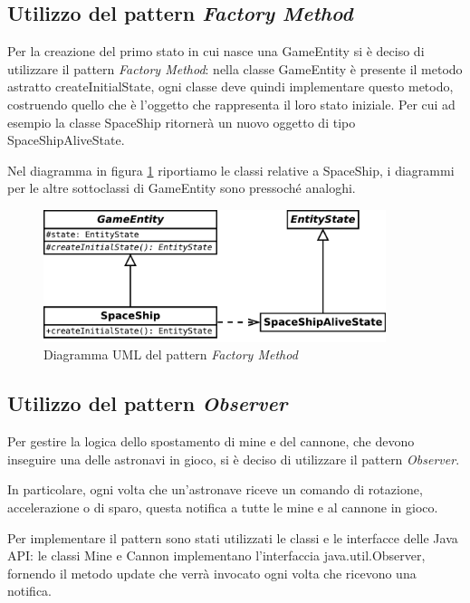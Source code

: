 \documentclass[a4paper,12pt]{article}
\begin{document}
\subsection{Utilizzo del pattern \emph{Factory Method}}

Per la creazione del primo stato in cui nasce una \textsf{GameEntity} si \`e deciso di utilizzare il pattern \emph{Factory Method}: nella classe \textsf{GameEntity} \`e presente il metodo astratto \textsf{createInitialState}, ogni classe deve quindi implementare questo metodo, costruendo quello che \`e l'oggetto che rappresenta il loro stato iniziale. Per cui ad esempio la classe \textsf{SpaceShip} ritorner\`a un nuovo oggetto di tipo \textsf{SpaceShipAliveState}.

Nel diagramma in figura \ref{img:FactoryMethod} riportiamo le classi relative a \textsf{SpaceShip}, i diagrammi per le altre sottoclassi di \textsf{GameEntity} sono pressoch\'e analoghi.

\begin{figure}[h]
\centering
\includegraphics[width=10cm]{FactoryMethod.pdf}
\caption{Diagramma UML del pattern \emph{Factory Method}}
\label{img:FactoryMethod}
\end{figure}

\subsection{Utilizzo del pattern \emph{Observer}}

Per gestire la logica dello spostamento di mine e del cannone, che devono inseguire una delle astronavi in gioco, si \`e deciso di utilizzare il pattern \emph{Observer}.

In particolare, ogni volta che un'astronave riceve un comando di rotazione, accelerazione o di sparo, questa notifica a tutte le mine e al cannone in gioco.

Per implementare il pattern sono stati utilizzati le classi e le interfacce delle Java API: le classi \textsf{Mine} e \textsf{Cannon} implementano l'interfaccia \textsf{java.util.Observer}, fornendo il metodo \textsf{update} che verr\`a invocato ogni volta che ricevono una notifica.
\end{document}
